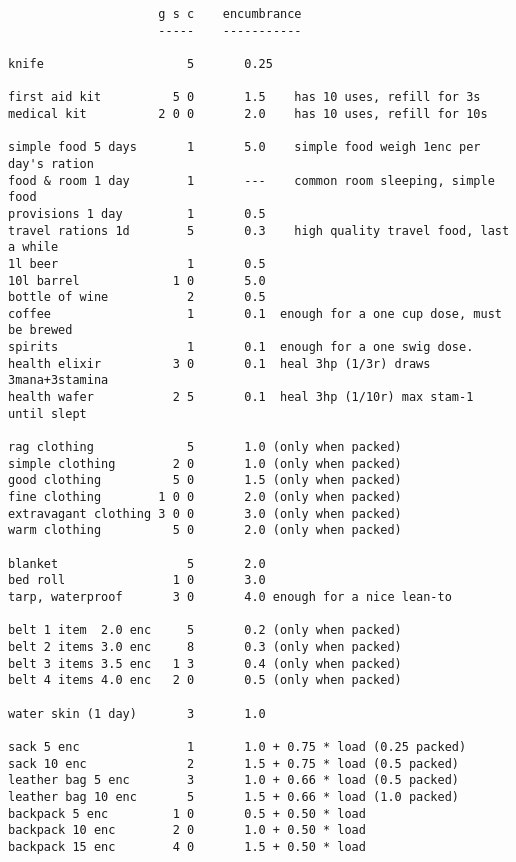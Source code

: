 \small
\pagebreak[1] \begin{verbatim}
                     g s c    encumbrance
                     -----    -----------

knife                    5       0.25

first aid kit          5 0       1.5    has 10 uses, refill for 3s
medical kit          2 0 0       2.0    has 10 uses, refill for 10s

simple food 5 days       1       5.0    simple food weigh 1enc per day's ration
food & room 1 day        1       ---    common room sleeping, simple food
provisions 1 day         1       0.5
travel rations 1d        5       0.3    high quality travel food, last a while
1l beer                  1       0.5
10l barrel             1 0       5.0
bottle of wine           2       0.5
coffee                   1       0.1  enough for a one cup dose, must be brewed
spirits                  1       0.1  enough for a one swig dose.
health elixir          3 0       0.1  heal 3hp (1/3r) draws 3mana+3stamina
health wafer           2 5       0.1  heal 3hp (1/10r) max stam-1 until slept

rag clothing             5       1.0 (only when packed)
simple clothing        2 0       1.0 (only when packed)
good clothing          5 0       1.5 (only when packed)
fine clothing        1 0 0       2.0 (only when packed)
extravagant clothing 3 0 0       3.0 (only when packed)
warm clothing          5 0       2.0 (only when packed)

blanket                  5       2.0
bed roll               1 0       3.0
tarp, waterproof       3 0       4.0 enough for a nice lean-to

belt 1 item  2.0 enc     5       0.2 (only when packed)
belt 2 items 3.0 enc     8       0.3 (only when packed)
belt 3 items 3.5 enc   1 3       0.4 (only when packed)
belt 4 items 4.0 enc   2 0       0.5 (only when packed)

water skin (1 day)       3       1.0

sack 5 enc               1       1.0 + 0.75 * load (0.25 packed)
sack 10 enc              2       1.5 + 0.75 * load (0.5 packed)
leather bag 5 enc        3       1.0 + 0.66 * load (0.5 packed)
leather bag 10 enc       5       1.5 + 0.66 * load (1.0 packed)
backpack 5 enc         1 0       0.5 + 0.50 * load
backpack 10 enc        2 0       1.0 + 0.50 * load
backpack 15 enc        4 0       1.5 + 0.50 * load


\end{verbatim}
